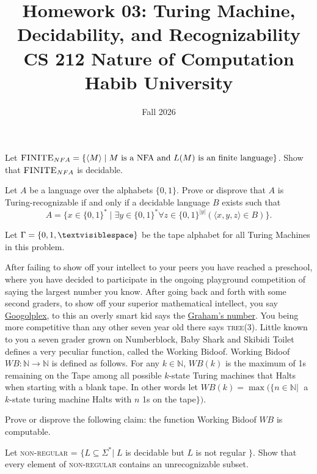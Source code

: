 \documentclass[addpoints]{exam}
\title{Homework 03: Turing Machine, Decidability, and Recognizability\\ \vspace{0.5cm} \Large CS 212 Nature of Computation\\Habib University}
\date{Fall 2026}
\newcommand{\blank}{\textvisiblespace}
\begin{document}
\maketitle

\begin{questions}

    \question[10] Let $\textsc{FINITE}_{NFA} = \{\langle M \rangle \mid M \text{ is a NFA and } L(M) \text{ is an finite language}\}$. Show that $\textsc{FINITE}_{NFA}$ is decidable.

    \begin{solution}
    \end{solution}

    
    \question[10] Let $A$ be a language over the alphabets $\{0,1\}$. Prove or disprove that $A$ is Turing-recognizable if and only if a decidable language $B$ exists such that 
    $$A = \{x \in \{0,1\}^*\mid \exists y\in \{0,1\}^* \forall z \in \{0,1\}^{|y|} (\langle x, y, z\rangle \in B)\}.$$

    \begin{solution}
    \end{solution}


    \question[10] Let $\Gamma = \{0, 1, \blank\}$ be the tape alphabet for all Turing Machines in this problem. 
    
    After failing to show off your intellect to your peers you have reached a preschool, where you have decided to participate in the ongoing playground competition of saying the largest number you know. After going back and forth with some second graders, to show off your superior mathematical intellect, you say \href{https://en.wikipedia.org/wiki/Googolplex}{Googolplex}, to this an overly smart kid says the \href{https://en.wikipedia.org/wiki/Graham%27s_number}{Graham's number}. You being more competitive than any other seven year old there says \textsc{tree}(3). Little known to you a seven grader grown on Numberblock, Baby Shark and Skibidi Toilet defines a very peculiar function, called the Working Bidoof. 
    Working Bidoof $WB : \mathbb{N} \to \mathbb{N}$ is defined as follows. For any $k \in \mathbb{N}$, $WB(k)$ is the maximum of 1s remaining on the Tape among all possible $k$-state Turing machines that Halts when starting with a blank tape. In other words let $WB(k) = \max(\{n \in \mathbb{N}|\;$ a $k$-state turing machine Halts with $n$ 1s on the tape$\})$. 

    Prove or disprove the following claim: the function Working Bidoof $WB$ is computable.
    
    \begin{solution}
    \end{solution}
      
    \question[10] Let \textsc{non-regular} = $\{L \subseteq \Sigma^*|\; L$ is decidable but $L$ is not regular $\}$. 
    Show that every element of \textsc{non-regular} contains an unrecognizable subset.
    \begin{solution}
    \end{solution}
    \end{questions}
\end{document}
